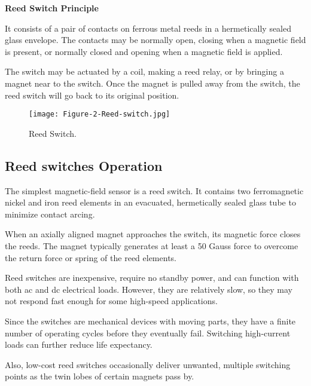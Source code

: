 \textbf{Reed Switch Principle}\vspace{.3cm}

It consists of a pair of contacts on ferrous metal reeds in a hermetically sealed glass envelope. The contacts may be normally open, closing when a magnetic field is present, or normally closed and opening when a magnetic field is applied.\vspace{.3cm}

The switch may be actuated by a coil, making a reed relay, or by bringing a magnet near to the switch. Once the magnet is pulled away from the switch, the reed switch will go back to its original position.\vspace{.3cm}

\begin{figure}[h]
	\centering
	\texttt{[image: Figure-2-Reed-switch.jpg]}
	\caption{Reed Switch.}
\end{figure}
\subsection{Reed switches Operation}
The simplest magnetic-field sensor is a reed switch. It contains two ferromagnetic nickel and iron reed elements in an evacuated, hermetically sealed glass tube to minimize contact arcing.\vspace{.3cm}

When an axially aligned magnet approaches the switch, its magnetic force closes the reeds. The magnet typically generates at least a 50 Gauss force to overcome the return force or spring of the reed elements.\vspace{.3cm}

Reed switches are inexpensive, require no standby power, and can function with both ac and dc electrical loads. However, they are relatively slow, so they may not respond fast enough for some high-speed applications.\vspace{.3cm}



Since the switches are mechanical devices with moving parts, they have a finite number of operating cycles before they eventually fail. Switching high-current loads can further reduce life expectancy.\vspace{.3cm}

Also, low-cost reed switches occasionally deliver unwanted, multiple switching points as the twin lobes of certain magnets pass by.\vspace{.3cm}


